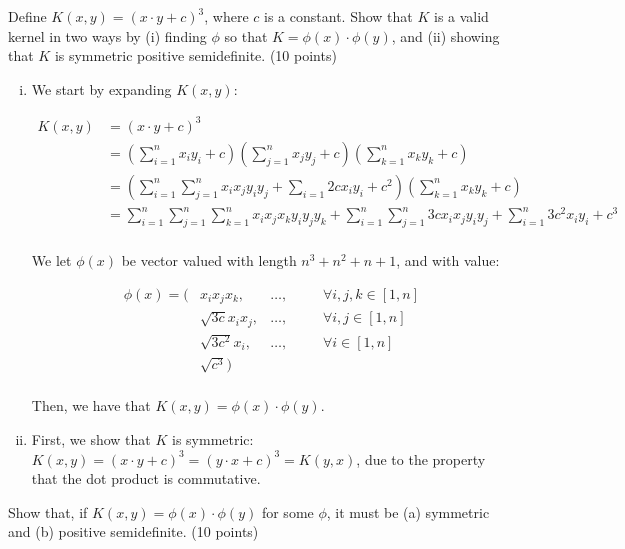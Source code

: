 \documentclass[fleqn]{homework}
\begin{document}
  \begin{problem}{2}
    \begin{question}
      Define $K(x,y)=(x \cdot y+c)^3$, where $c$ is a constant. Show that $K$ is
      a valid kernel in two ways by (i) finding $\phi$ so that
      $K = \phi(x) \cdot \phi(y)$, and (ii) showing that $K$ is symmetric
      positive semidefinite. (10 points)
    \end{question}

    \begin{enumerate}[(i)]
    \item We start by expanding $K(x,y)$:

      \begin{align*}
        K(x,y) &= (x \cdot y + c)^3 \\
               &= \left(\sum_{i=1}^n x_i y_i + c\right)\left(\sum_{j=1}^n x_j y_j + c\right)\left(\sum_{k=1}^n x_k y_k + c\right)\\
               &= \left(\sum_{i=1}^n \sum_{j=1}^n x_ix_jy_iy_j + \sum_{i=1} 2cx_iy_i + c^2\right)\left(\sum_{k=1}^n x_k y_k + c\right)\\
               &= \sum_{i=1}^n \sum_{j=1}^n \sum_{k=1}^n x_ix_jx_k y_iy_jy_k + \sum_{i=1}^n \sum_{j=1}^n 3cx_ix_jy_iy_j + \sum_{i=1}^n 3c^2x_iy_i + c^3 \\
      \end{align*}

      We let $\phi(x)$ be vector valued with length $n^3 + n^2 + n + 1$, and
      with value:

      \begin{align*}
        \phi(x) = (&x_i x_j x_k, &\dots, &&\:\:\:\: \forall i,j,k \in [1,n] \\
        &\sqrt{3c} x_i x_j, &\dots, &&\:\:\:\: \forall i,j \in [1,n] \\
        &\sqrt{3c^2} x_i, &\dots, &&\:\:\:\: \forall i \in [1,n] \\
        & \sqrt{c^3})\\
      \end{align*}

      Then, we have that $K(x,y) = \phi(x) \cdot \phi(y)$.
    \item First, we show that $K$ is symmetric:
      $K(x,y) = (x \cdot y + c)^3 = (y \cdot x + c)^3 = K(y,x)$, due to the
      property that the dot product is commutative.
    \end{enumerate}
  \end{problem}

  \begin{problem}{3}
    \begin{question}
      Show that, if $K(x,y) = \phi(x) \cdot \phi(y)$ for some $\phi$, it must be
      (a) symmetric and (b) positive semidefinite. (10 points)
    \end{question}
  \end{problem}
\end{document}

